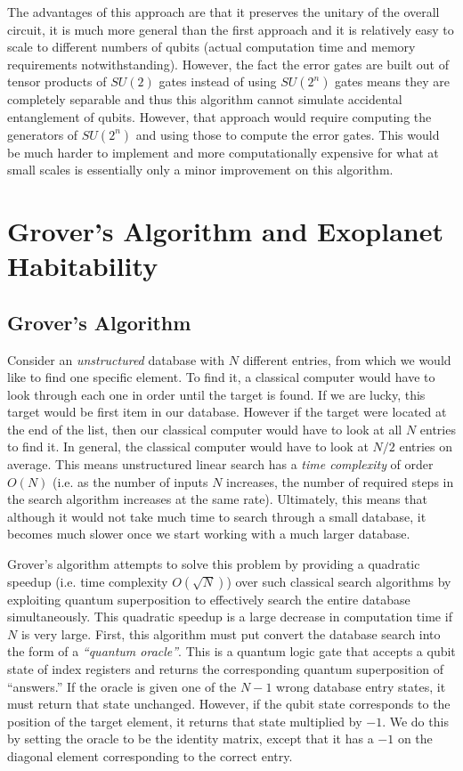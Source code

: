 \documentclass{article}[11pt]
\begin{document}
The advantages of this approach are that it preserves the unitary of the overall circuit, it is much more general than the first approach and it is relatively easy to scale to different numbers of qubits (actual computation time and memory requirements notwithstanding). However, the fact the error gates are built out of tensor products of $SU(2)$ gates instead of using $SU(2^n)$ gates means they are completely separable and thus this algorithm cannot simulate accidental entanglement of qubits. However, that approach would require computing the generators of $SU(2^n)$ and using those to compute the error gates. This would be much harder to implement and more computationally expensive for what at small scales is essentially only a minor improvement on this algorithm.


\pagebreak
\section{Grover's Algorithm and Exoplanet Habitability}\label{section:groverproject}
\subsection{Grover's Algorithm}
Consider an \emph{unstructured} database with $N$ different entries, from which we would like to find one specific element. To find it, a classical computer would have to look through each one in order until the target is found. If we are lucky, this target would be first item in our database. However if the target were located at the end of the list, then our classical computer would have to look at all $N$ entries to find it. In general, the classical computer would have to look at $N/2$ entries on average. This means unstructured linear search has a \emph{time complexity} of order $O(N)$ (i.e. as the number of inputs $N$ increases, the number of required steps in the search algorithm increases at the same rate).\cite{candela} Ultimately, this means that although it would not take much time to search through a small database, it becomes much slower once we start working with a much larger database.

Grover's algorithm attempts to solve this problem by providing a quadratic speedup (i.e. time complexity $O(\sqrt N)$) over such classical search algorithms by exploiting quantum superposition to effectively search the entire database simultaneously.\cite{candela,grover} This quadratic speedup is a large decrease in computation time if $N$ is very large. First, this algorithm must put convert the database search into the form of a \textit{``quantum oracle''}. This is a quantum logic gate that accepts a qubit state of index registers and returns the corresponding quantum superposition of ``answers.''\cite{candela} If the oracle is given one of the $N-1$ wrong database entry states, it must return that state unchanged. However, if the qubit state corresponds to the position of the target element, it returns that state multiplied by $-1$. We do this by setting the oracle to be the identity matrix, except that it has a $-1$ on the diagonal element corresponding to the correct entry.
\end{document}
